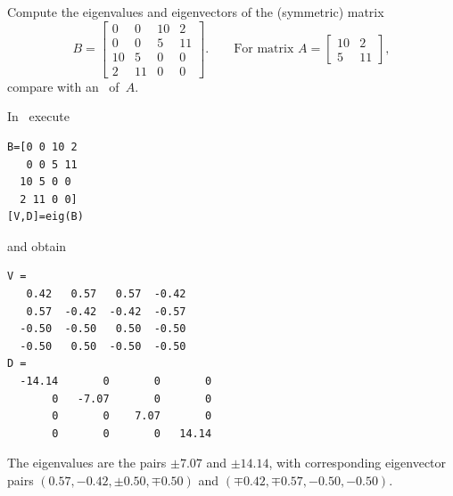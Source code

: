 \begin{example} \label{eg:eigsvd}
Compute the eigenvalues and eigenvectors of the (symmetric) matrix
\begin{equation*}
B=\begin{bmatrix} 0&0&10&2\\
0&0&5&11\\
10&5&0&0\\
2&11&0&0 \end{bmatrix}.
\qquad \text{For matrix }A=\begin{bmatrix} 10&2\\5&11 \end{bmatrix},
\end{equation*}
compare with an \svd\ of~\(A\).
\begin{solution} In \script\ execute
\setbox\ajrqrbox\hbox{}%
\marginpar{\usebox{\ajrqrbox}}%
\begin{verbatim}
B=[0 0 10 2
   0 0 5 11
  10 5 0 0
  2 11 0 0]
[V,D]=eig(B)
\end{verbatim}
and obtain \twodp
\begin{verbatim}
V =
   0.42   0.57   0.57  -0.42
   0.57  -0.42  -0.42  -0.57
  -0.50  -0.50   0.50  -0.50
  -0.50   0.50  -0.50  -0.50
D =
  -14.14       0       0       0
       0   -7.07       0       0
       0       0    7.07       0
       0       0       0   14.14
\end{verbatim}
The eigenvalues are the pairs \(\pm7.07\) and \(\pm14.14\), with corresponding eigenvector pairs \((0.57,-0.42,\pm0.50,\mp0.50)\) and \((\mp0.42,\mp0.57,-0.50,-0.50)\).



\end{solution}
\end{example}
